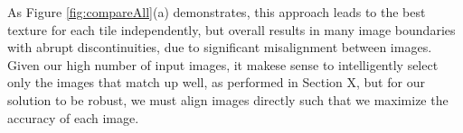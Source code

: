 \documentclass[]{spie}  %
\begin{document}
As Figure \ref{fig:compareAll}(a) demonstrates, this approach leads to
the best texture for each tile independently, but overall results in
many image boundaries with abrupt discontinuities, due to significant
misalignment between images. Given our high number of input images, it
makese sense to intelligently select only the images that match up
well, as performed in Section X, but for our solution to be robust, we
must align images directly such that we maximize the accuracy of each image.



\end{document}
